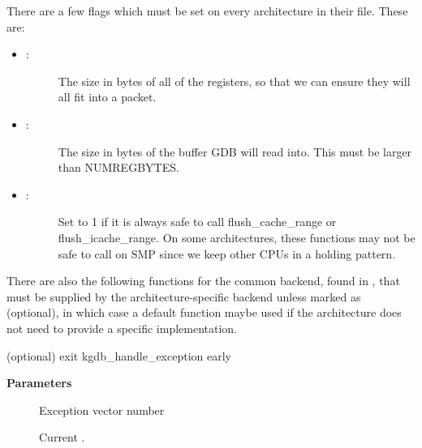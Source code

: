 \documentclass[a4paper,8pt,english]{sphinxmanual}
\begin{document}
There are a few flags which must be set on every architecture in their
 file. These are:
\begin{itemize}
\item {} \begin{description}
\item[{:}] \leavevmode
The size in bytes of all of the registers, so that we
can ensure they will all fit into a packet.

\end{description}

\item {} \begin{description}
\item[{:}] \leavevmode
The size in bytes of the buffer GDB will read into. This must
be larger than NUMREGBYTES.

\end{description}

\item {} \begin{description}
\item[{:}] \leavevmode
Set to 1 if it is always safe to call
flush\_cache\_range or flush\_icache\_range. On some architectures,
these functions may not be safe to call on SMP since we keep other
CPUs in a holding pattern.

\end{description}

\end{itemize}

There are also the following functions for the common backend, found in
, that must be supplied by the architecture-specific
backend unless marked as (optional), in which case a default function
maybe used if the architecture does not need to provide a specific
implementation.

\begin{fulllineitems}
\label{dev-tools/kgdb:c.kgdb_skipexception}
(optional) exit kgdb\_handle\_exception early

\end{fulllineitems}


\textbf{Parameters}
\begin{description}
\item[{}] \leavevmode
Exception vector number

\item[{}] \leavevmode
Current .

\end{description}
\end{document}
